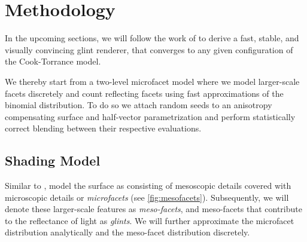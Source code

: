\section{Methodology}
\label{sec:methodology}
%
In the upcoming sections, we will follow the work of \textcite{deliot2023} to derive a fast, stable, and visually convincing glint renderer, that converges to any given configuration of the Cook-Torrance model.

We thereby start from a two-level microfacet model where we model larger-scale facets discretely and count reflecting facets using fast approximations of the binomial distribution.
%
To do so we attach random seeds to an anisotropy compensating surface and half-vector parametrization and perform statistically correct blending between their respective evaluations.


\subsection{Shading Model}
\label{sec:shading}


%
Similar to \textcite{zirr2016}, \textcite{deliot2023} model the surface as consisting of mesoscopic details covered with microscopic details or \emph{microfacets} (see \cref{fig:mesofacets}).
%
Subsequently, we will denote these larger-scale features as \emph{meso-facets}, and 
meso-facets that contribute to the reflectance of light as \emph{glints}.
%
We will further approximate the microfacet distribution analytically and the meso-facet distribution discretely.


